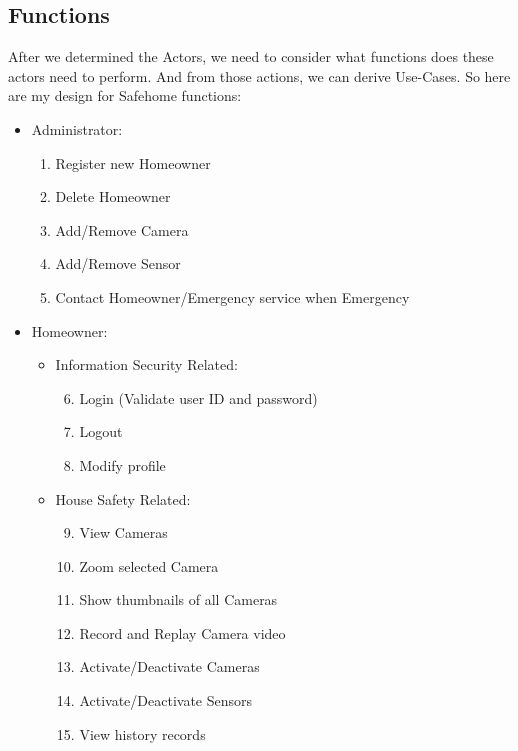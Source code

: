 \documentclass[twoside,11pt]{article}
\begin{document}
\subsection{Functions}
After we determined the Actors, we need to consider what functions does these actors need to perform. And from those actions, we can derive Use-Cases. So here are my design for Safehome functions:
\begin{itemize}
    \item Administrator:
          \begin{enumerate}
              \item Register new Homeowner
              \item Delete Homeowner
              \item Add/Remove Camera
              \item Add/Remove Sensor
              \item Contact Homeowner/Emergency service when Emergency
          \end{enumerate}
    \item Homeowner:
          \begin{itemize}
              \item Information Security Related:
                    \begin{enumerate}
                        \setcounter{enumi}{5}
                        \item Login (Validate user ID and password)
                        \item Logout
                        \item Modify profile
                    \end{enumerate}
              \item House Safety Related:
                    \begin{enumerate}
                        \setcounter{enumi}{8}
                        \item View Cameras
                        \item Zoom selected Camera
                        \item Show thumbnails of all Cameras
                        \item Record and Replay Camera video
                        \item Activate/Deactivate Cameras
                        \item Activate/Deactivate Sensors
                        \item View history records
                    \end{enumerate}
          \end{itemize}


\end{itemize}
\end{document}
